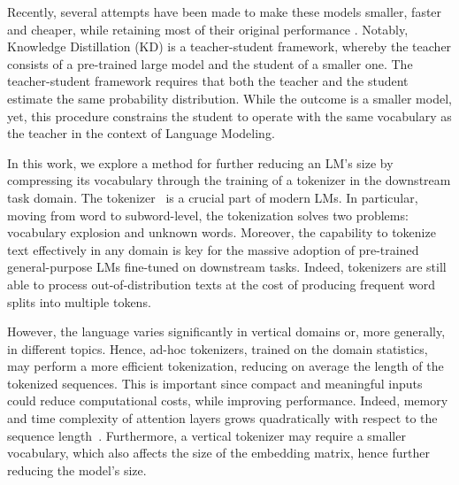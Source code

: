 \documentclass[11pt]{article}
\newcommand{\lr}[1]{\color{ForestGreen} #1}
\begin{document}
Recently, several attempts have been made to make these models smaller, faster and cheaper, while retaining most of their original performance \cite{gupta2015deep,quantization}. 
Notably, Knowledge Distillation (KD) \cite{hinton2015distilling} is %
a teacher-student framework, whereby the teacher consists of a pre-trained large model and the student of a smaller one. The teacher-student framework requires that both the teacher and the student estimate the same probability distribution. While the outcome is a smaller model, yet, this procedure constrains the student to operate with the same vocabulary as the teacher in the context of Language Modeling. 

In this work, we explore a method for further reducing an LM’s size by compressing its vocabulary through the training of a tokenizer in the downstream task domain.
The tokenizer~\cite{sennrich2016neural,schuster2012japanese,kudo2018sentencepiece} is a crucial part of modern LMs. In particular, moving from word to subword-level, the tokenization solves two problems: vocabulary explosion and unknown words. Moreover, the capability to tokenize text effectively in any domain is key for the massive adoption of pre-trained general-purpose LMs %
fine-tuned on downstream tasks. Indeed, tokenizers are still able to process out-of-distribution texts at the cost of producing frequent word splits into multiple tokens.

However, the language varies significantly in vertical domains or, more generally, in different topics. %
Hence, ad-hoc tokenizers, trained on the domain statistics, may perform a more efficient tokenization, reducing on average the length of the tokenized sequences. This is important since compact and meaningful inputs could reduce computational costs, while improving performance. %
Indeed, memory and time complexity of attention layers grows quadratically with respect to the sequence length~\cite{vaswani2017attention}. 
Furthermore, a vertical tokenizer may require a smaller vocabulary, which also affects the size of the embedding matrix, hence further reducing the model's size.
\end{document}
